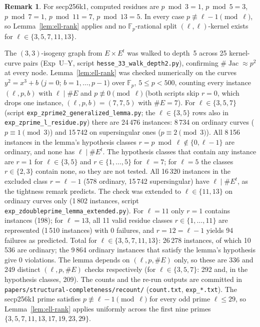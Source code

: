 \documentclass[11pt,a4paper]{article}
\theoremstyle{definition}
\newtheorem{remark}[theorem]{Remark}
\newcommand{\FF}{\mathbb{F}}
\newcommand{\Jac}{\operatorname{Jac}}
\begin{document}
\begin{remark}
\begin{sloppypar}
For secp256k1, computed residues are $p \bmod 3 = 1$, $p \bmod 5 = 3$,
$p \bmod 7 = 1$, $p \bmod 11 = 7$, $p \bmod 13 = 5$.  In every case
$p \not\equiv \ell{-}1 \pmod\ell$, so Lemma~\ref{lem:ell-rank} applies
and no $\FF_p$-rational split $(\ell,\ell)$-kernel exists for
$\ell \in \{3,5,7,11,13\}$.
\end{sloppypar}
The $(3,3)$-isogeny graph from $E \times E^t$ was walked to depth~5
across 25 kernel-curve pairs (Exp~U--Y, script
\texttt{hesse\_33\_walk\_depth2.py}),
confirming $\#\Jac \approx p^2$ at every node.
Lemma~\ref{lem:ell-rank} was checked numerically on the curves
$y^2 = x^3 + b$ ($j = 0$; $b = 1,\ldots,p{-}1$) over $\FF_p$, $5 \le p < 500$,
counting every instance $(\ell, p, b)$ with $\ell \mid \#E$ and
$p \not\equiv 0 \pmod \ell$ (both scripts skip $r = 0$, which drops one
instance, $(\ell,p,b) = (7,7,5)$ with $\#E = 7$).
For $\ell \in \{3,5,7\}$
(script \texttt{exp\_zprime2\_generalized\_lemma.py}; the $\ell \in \{3,5\}$
rows also in \texttt{exp\_zprime\_l\_residue.py}) there are 24\,476
instances: 8\,734 on ordinary curves ($p \equiv 1 \pmod 3$) and 15\,742 on
supersingular ones ($p \equiv 2 \pmod 3$).  All 8\,156 instances in the
lemma's hypothesis classes $r = p \bmod \ell \notin \{0, \ell{-}1\}$ are
ordinary, and none has $\ell \mid \#E^t$.  The hypothesis classes that
contain any instance are $r = 1$ for $\ell \in \{3,5\}$ and
$r \in \{1,\ldots,5\}$ for $\ell = 7$; for $\ell = 5$ the classes $r \in \{2,3\}$ contain none, so
they are not tested.  All 16\,320 instances in the excluded class
$r = \ell{-}1$ (578 ordinary, 15\,742 supersingular) have $\ell \mid \#E^t$,
as the tightness remark predicts.
The check was extended to $\ell \in \{11,13\}$ on ordinary curves only
(1\,802 instances, script \texttt{exp\_zdoubleprime\_lemma\_extended.py}).
For $\ell = 11$ only $r = 1$ contains instances (198); for $\ell = 13$, all
11 valid residue classes $r \in \{1,\ldots,11\}$ are represented
(1\,510 instances) with $0$ failures, and $r = 12 = \ell{-}1$ yields 94
failures as predicted.  Total for $\ell \in \{3,5,7,11,13\}$: 26\,278
instances, of which 10\,536 are ordinary; the 9\,864 ordinary instances that
satisfy the lemma's hypothesis give $0$ violations.  The lemma depends on
$(\ell, p, \#E)$ only, so these are 336 and 249 distinct
$(\ell, p, \#E)$ checks respectively (for $\ell \in \{3,5,7\}$: 292 and,
in the hypothesis classes, 209).  The counts and the
re-run outputs are committed in
\texttt{papers/structural-completeness/recount/}
(\texttt{count.txt}, \texttt{exp\_*.txt}).
The secp256k1 prime satisfies $p \not\equiv \ell{-}1 \pmod{\ell}$ for every
odd prime $\ell \leq 29$, so Lemma~\ref{lem:ell-rank} applies uniformly
across the first nine primes $\{3,5,7,11,13,17,19,23,29\}$.
\end{remark}
\end{document}
